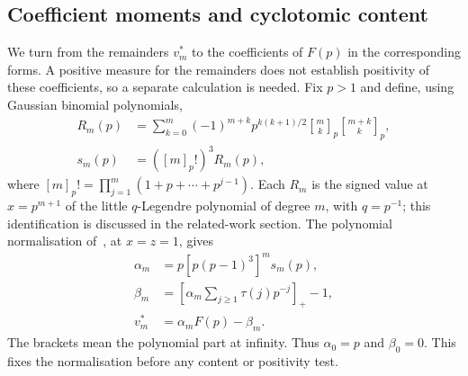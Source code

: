 \documentclass[11pt]{article}
\begin{document}
\subsection{Coefficient moments and cyclotomic content}
\label{long1049:sec:coefficient-questions}


We turn from the remainders $v_m^*$ to the coefficients of $F(p)$
in the corresponding forms. A positive measure for the remainders
does not establish positivity of these coefficients, so a separate
calculation is needed. Fix $p>1$ and define, using Gaussian binomial
polynomials,
\[
 \begin{aligned}
 R_m(p)&=\sum_{k=0}^m(-1)^{m+k}p^{k(k+1)/2}
          \genfrac{[}{]}{0pt}{}{m}{k}_p\genfrac{[}{]}{0pt}{}{m+k}{k}_p,\\
 s_m(p)&=([m]_p!)^3R_m(p),
 \end{aligned}
\]
where $[m]_p!=\prod_{j=1}^m(1+p+\cdots+p^{j-1})$.
Each $R_m$ is the signed value at $x=p^{m+1}$ of the little
$q$-Legendre polynomial of degree $m$, with $q=p^{-1}$; this
identification is discussed in the related-work section.
The polynomial normalisation of~\cite[Sec.~3, p.~5]{zudilin2016}, at
$x=z=1$, gives
\[
 \begin{aligned}
 \alpha_m&=p[p(p-1)^3]^m s_m(p),\\
 \beta_m&=\left[\alpha_m\sum_{j\ge1}\tau(j)p^{-j}\right]_+-1,\\
 v_m^*&=\alpha_mF(p)-\beta_m.
 \end{aligned}
\]
The brackets mean the polynomial part at infinity. Thus
$\alpha_0=p$ and $\beta_0=0$. This fixes the normalisation before any
content or positivity test.
\end{document}
